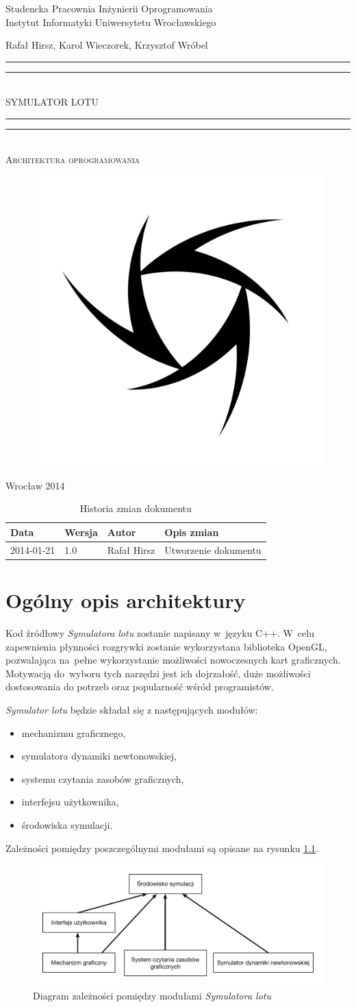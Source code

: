 \documentclass{mwrep}
\newcommand*{\titleGP}{\begingroup
\centering

{\large Studencka Pracownia Inżynierii Oprogramowania}\\Instytut Informatyki Uniwersytetu Wrocławskiego\par
\vspace*{16\baselineskip}

{\Large Rafał Hirsz, Karol Wieczorek, Krzysztof Wróbel\par}
\vspace*{\baselineskip}

\rule{\textwidth}{1.6pt}\vspace*{-\baselineskip}\vspace*{2pt}
\rule{\textwidth}{0.4pt}\\[\baselineskip]

{\Huge SYMULATOR LOTU}\\[0.2\baselineskip]

\rule{\textwidth}{0.4pt}\vspace*{-\baselineskip}\vspace{3.2pt}
\rule{\textwidth}{1.6pt}\\[\baselineskip]

\scshape
{\huge Architektura oprogramowania}\par
\vspace*{2\baselineskip}

\begin{figure}[h]
\centering
\includegraphics[width=5\baselineskip]{flightsim-team-logo.pdf}
\end{figure}
\vfill

{\large Wrocław 2014}\par

\pagebreak

\endgroup}
\begin{document}
\thispagestyle{empty}
\titleGP

\begin{center}
\begin{table}[h]
\begin{center}
\caption{Historia zmian dokumentu}\label{T:Zmiany}
\vspace{3ex}
\begin{tabularx}{1\textwidth}{|l|l|l|X|}
\hline
Data & Wersja & Autor & Opis zmian \\ \hline
2014-01-21 & 1.0 & Rafał Hirsz & Utworzenie dokumentu \\
\hline
\end{tabularx}
\end{center}
\end{table}
\end{center}

\pagebreak

\tableofcontents

\chapter{Ogólny opis architektury}

Kod źródłowy \textit{Symulatora lotu} zostanie napisany w~języku C++. W~celu zapewnienia płynności rozgrywki zostanie wykorzystana biblioteka \linebreak OpenGL, pozwalająca na~pełne wykorzystanie możliwości nowoczesnych kart graficznych. Motywacją do~wyboru tych narzędzi jest ich dojrzałość, duże możliwości dostosowania do potrzeb oraz popularność wśród programistów.

\vspace{1em}
\textit{Symulator lotu} będzie składał się z następujących modułów:
\begin{itemize}
    \item mechanizmu graficznego,
    \item symulatora dynamiki newtonowskiej,
    \item systemu czytania zasobów graficznych,
    \item interfejsu użytkownika,
    \item środowiska symulacji.
\end{itemize}

\vspace{1em}
Zależności pomiędzy poszczególnymi modułami są opisane na rysunku \ref{F:zaleznosci}.

\begin{figure}[h]
\centering
\caption{Diagram zależności pomiędzy modułami \textit{Symulatora lotu} \label{F:zaleznosci}}
\includegraphics[width=\textwidth]{diagram-zaleznosci-ai.pdf}
\end{figure}
\end{document}
